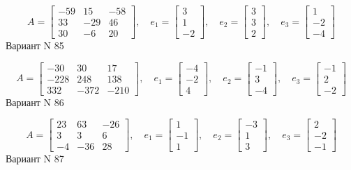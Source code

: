 \documentclass[11pt]{report}
\begin{document}
$$A = \left[\begin{matrix}-59 & 15 & -58\\33 & -29 & 46\\30 & -6 & 20\end{matrix}\right],\quad e_1 = \left[\begin{matrix}3\\1\\-2\end{matrix}\right],\quad e_2 = \left[\begin{matrix}3\\3\\2\end{matrix}\right],\quad e_3 = \left[\begin{matrix}1\\-2\\-4\end{matrix}\right]$$Вариант N 85

$$A = \left[\begin{matrix}-30 & 30 & 17\\-228 & 248 & 138\\332 & -372 & -210\end{matrix}\right],\quad e_1 = \left[\begin{matrix}-4\\-2\\4\end{matrix}\right],\quad e_2 = \left[\begin{matrix}-1\\3\\-4\end{matrix}\right],\quad e_3 = \left[\begin{matrix}-1\\2\\-2\end{matrix}\right]$$Вариант N 86

$$A = \left[\begin{matrix}23 & 63 & -26\\3 & 3 & 6\\-4 & -36 & 28\end{matrix}\right],\quad e_1 = \left[\begin{matrix}1\\-1\\1\end{matrix}\right],\quad e_2 = \left[\begin{matrix}-3\\1\\3\end{matrix}\right],\quad e_3 = \left[\begin{matrix}2\\-2\\-1\end{matrix}\right]$$Вариант N 87
\end{document}
